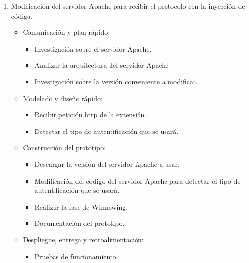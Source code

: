 \documentclass[12pt, a4paper, titlepage]{report}
\begin{document}
\begin{enumerate}
            
            \item Modificación del servidor Apache para recibir el protocolo con la inyección de código.
            \begin{itemize}
                \item  Comunicación y plan rápido: 
                \begin{itemize}
                    \item Investigación sobre el servidor Apache.
                    \item Analizar la arquitectura del servidor Apache
                    \item Investigación sobre la versión conveniente a modificar.
                \end{itemize}
                \item Modelado y diseño rápido: 
                \begin{itemize}
                    \item Recibir petición \acrshort{http} de la extensión. 
                    \item  Detectar el tipo de autentificación que se usará.
                \end{itemize}
                \item Construcción del prototipo: 
                \begin{itemize}
                    \item Descargar la versión del servidor Apache a usar.
                    \item Modificación del código del servidor Apache para detectar el tipo de autentificación que se usará. 
                    \item Realizar la fase de Winnowing.
                    \item Documentación del prototipo.
                \end{itemize}
                \item Despliegue, entrega y retroalimentación:
                \begin{itemize}
                    \item Pruebas de funcionamiento.
                \end{itemize}
            \end{itemize}
            

\end{enumerate}
\end{document}
